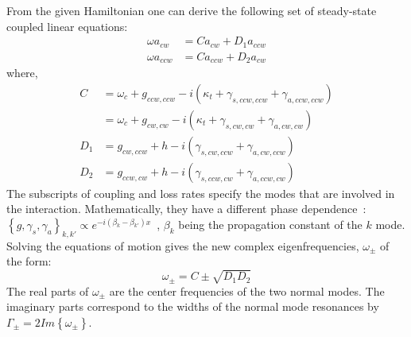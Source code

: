 \documentclass[journal=jacsat,manuscript=article]{achemso}
\begin{document}
From the given Hamiltonian one can derive the following set of steady-state coupled linear equations:
\begin{equation}
\begin{split}
\omega a_{cw} &= C a_{cw} + D_1 a_{ccw} \\
\omega a_{ccw} &= C a_{ccw} + D_2 a_{cw}
\end{split}
\end{equation}
where,
\begin{equation}
\begin{split}
C &= \omega_c + g_{ccw,ccw} -i \left(\kappa_t + \gamma_{s,ccw,ccw} + \gamma_{a,ccw,ccw}\right) \\
  &= \omega_c + g_{cw,cw} -i \left( \kappa_t + \gamma_{s,cw,cw} + \gamma_{a,cw,cw} \right) \\
D_1 &= g_{cw,ccw} + h - i \left(\gamma_{s,cw,ccw} + \gamma_{a,cw,ccw} \right) \\
D_2 &= g_{ccw,cw} + h - i \left(\gamma_{s,ccw,cw} + \gamma_{a,ccw,cw} \right)
\end{split}
\end{equation}
The subscripts of coupling and loss rates specify the modes that are involved in the interaction. Mathematically, they have a different phase dependence~\cite{yi2011multiple}: $\left\{g, \gamma_s, \gamma_a \right\}_{k,k'} \propto e^{- i \left(\beta_k - \beta_{k'} \right) x}$~\cite{yi2011multiple}, $\beta_k$ being the propagation constant of the $k$ mode.
Solving the equations of motion gives the new complex eigenfrequencies, $\omega_{\pm}$ of the form:
\begin{equation}
\omega_{\pm} = C \pm \sqrt{D_1 D_2}
\end{equation}
The real parts of $\omega_{\pm}$ are the center frequencies of the two normal modes. The imaginary parts correspond to the widths of the normal mode resonances by $\Gamma_{\pm} = 2 Im\left\{ \omega_{\pm} \right\}$.
\end{document}
